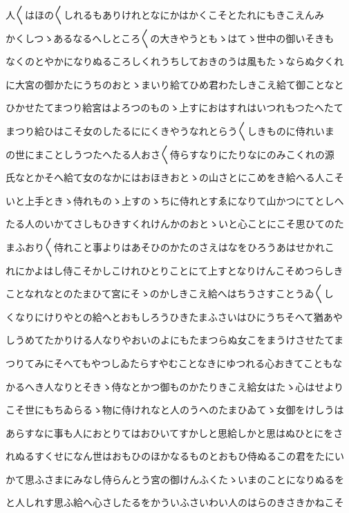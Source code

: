 \documentclass[a4paper,11pt,landscape]{ltjtarticle}
\begin{document}
人〱はほの〱しれるもありけれとなにかはかくこそとたれにもきこえんみ
\par\medskip
かくしつゝあるなるへしところ〱の大きやうともゝはてゝ世中の御いそきも
\par\medskip
なくのとやかになりぬるころしくれうちしておきのうは風もたゝならぬ夕くれ
\par\medskip
に大宮の御かたにうちのおとゝまいり給てひめ君わたしきこえ給て御ことなと
\par\medskip
ひかせたてまつり給宮はよろつのものゝ上すにおはすれはいつれもつたへたて
\par\medskip
まつり給ひはこそ女のしたるににくきやうなれとらう〱しきものに侍れいま
\par\medskip
の世にまことしうつたへたる人おさ〱侍らすなりにたりなにのみこくれの源
\par\medskip
氏なとかそへ給て女のなかにはおほきおとゝの山さとにこめをき給へる人こそ
\par\medskip
いと上手ときゝ侍れものゝ上すのゝちに侍れとすゑになりて山かつにてとしへ
\par\medskip
たる人のいかてさしもひきすくれけんかのおとゝいと心ことにこそ思ひてのた
\par\medskip
まふおり〱侍れこと事よりはあそひのかたのさえはなをひろうあはせかれこ
\par\medskip
れにかよはし侍こそかしこけれひとりことにて上すとなりけんこそめつらしき
\par\medskip
ことなれなとのたまひて宮にそゝのかしきこえ給へはちうさすことうゐ〱し
\par\medskip
くなりにけりやとの給へとおもしろうひきたまふさいはひにうちそへて猶あや
\par\medskip
しうめてたかりける人なりやおいのよにもたまつらぬ女こをまうけさせたてま
\par\medskip
つりてみにそへてもやつしゐたらすやむことなきにゆつれる心おきてこともな
\par\medskip
かるへき人なりとそきゝ侍なとかつ御ものかたりきこえ給女はたゝ心はせより
\par\medskip
こそ世にもちゐらるゝ物に侍けれなと人のうへのたまひゐてゝ女御をけしうは
\par\medskip
あらすなに事も人におとりてはおひいてすかしと思給しかと思はぬひとにをさ
\par\medskip
れぬるすくせになん世はおもひのほかなるものとおもひ侍ぬるこの君をたにい
\par\medskip
かて思ふさまにみなし侍らんとう宮の御けんふくたゝいまのことになりぬるを
\par\medskip
と人しれす思ふ給へ心さしたるをかういふさいわい人のはらのきさきかねこそ
\end{document}
